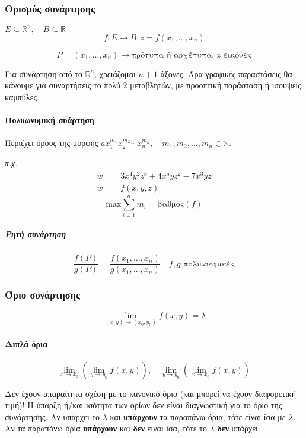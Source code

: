 \documentclass[11pt,a4paper,titlepage,draft]{article}
\begin{document}
\subsubsection{Ορισμός συνάρτησης}
\(E \subseteq   \mathbb R^n, \quad B \subseteq  \mathbb R \)
\[f: E \rightarrow B: z = f(x_1, \dots, x_n) \]
\begin{tikzpicture}
\end{tikzpicture}
\[P = \left( x_1, \dots, x_n \right) \rightarrow \text{πρότυπα ή αρχέτυπα, }z\text{ εικόνες} \]
Για συνάρτηση από το \( \mathbb R ^n\), χρειάζομαι \(n+1\) άξονες. Άρα γραφικές παραστάσεις θα κάνουμε για συναρτήσεις το πολύ 2 μεταβλητών, με προοπτική παράσταση ή ισουψείς καμπύλες.

\paragraph{Πολυωνυμική συάρτηση}
Περιέχει όρους της μορφής \(a x_1^{m_1} x_2^{m_2} \cdots x_n^{m_n}, \quad m_1,m_2,\dots,m_n \in  \mathbb N \).

\textit{π.χ.}
\begin{align*}
w&=3x^4y^2z^3+4x^5yz^2-7x^3yz \\
w&=f(x,y,z)
\end{align*}
\[
\mathrm{max} \sum_{i=1}^{n}m_i = \text{βαθμός}(f)
\]

\subparagraph{Ρητή συνάρτηση}
\[
\frac{f(P)}{g(P)} =
\frac{f(x_1,\dots,x_n)}{g(x_1,\dots,x_n)}
\quad
f,g \text{ πολυωνυμικές}
\]

\subsubsection{Όριο συνάρτησης}
\[ \lim_{(x,y) \to (x_0,y_0)} f(x,y) = \lambda\]

\paragraph{Διπλά όρια}
\[ \lim_{x \to x_0} \left( \lim_{y \to y_0} f(x,y) \right), \quad
   \lim_{y \to y_0} \left( \lim_{x \to x_0} f(x,y) \right)
\] 
\begin{attnbox}{}Δεν έχουν απαραίτητα σχέση με το κανονικό όριο (και μπορεί να έχουν διαφορετική τιμή)!
Η ύπαρξη ή/και ισότητα των ορίων δεν είναι διαγνωστική για το όριο της συνάρτησης. Αν υπάρχει το \(\lambda\) και \textbf{υπάρχουν} τα παραπάνω όρια, τότε είναι ίσα με \(\lambda\). Αν τα παραπάνω όρια \textbf{υπάρχουν} και \textbf{δεν} είναι ίσα, τότε το \(\lambda\) \textbf{δεν} υπάρχει.
\end{attnbox}
\end{document}
